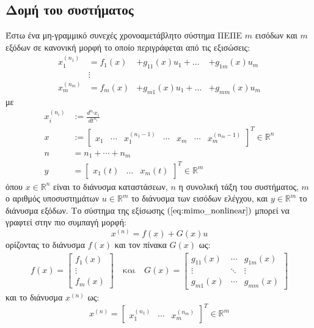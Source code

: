 \subsection{Δομή του συστήματος}
Έστω ένα μη-γραμμικό συνεχές χρονοαμετάβλητο σύστημα ΠΕΠΕ $m$ εισόδων και $m$ εξόδων σε κανονική μορφή το οποίο περιγράφεται από τις εξισώσεις:
\begin{equation}
\begin{alignedat}{3}
x_1^{(n_1)} &= f_1(x)   &+g_{11}(x) u_1 + \dots & + g_{1m}(x)u_m \\
            &\vdots & & \\
x_m^{(n_m)} &= f_m(x)  &+g_{m1}(x) u_1 + \dots & + g_{mm}(x)u_m
\end{alignedat}
\label{eq:mimo_nonlinear}
\end{equation}
με 
\begin{equation*}
\begin{split}
x_i^{(n_i)}    &:= \frac{d^{n_i} x_i }{d t^{n_i}} \\
x   &:= \begin{bmatrix} x_1 &\cdots & x_1^{(n_1-1)} & \cdots &
                               x_m &\cdots & x_m^{(n_m-1)}\end{bmatrix}^T \in \mathbb{R}^n \\
        n  &= n_1 + \cdots  + n_m \\
        y  &= \begin{bmatrix}
        x_1(t) & \dots & x_m(t)
        \end{bmatrix}^T \in \mathbb{R}^m
\end{split}
\end{equation*}
όπου $x \in \mathbb{R}^n$ είναι το διάνυσμα καταστάσεων, $n$ η συνολική τάξη του συστήματος, $m$ ο αριθμός υποσυστημάτων $u \in \mathbb{R}^m$ το διάνυσμα των εισόδων ελέγχου, και $y \in \mathbb{R}^m $ το διάνυσμα εξόδων. Το σύστημα της εξίσωσης $(\ref{eq:mimo_nonlinear})$ μπορεί να γραφτεί στην πιο συμπαγή μορφή:
\begin{equation}
	x^{(n)} = f(x) + G(x)u
	\label{eq:mimo_compact}
\end{equation}
ορίζοντας το διάνυσμα $f(x)$ και τον πίνακα $G(x)$ ως:
\begin{equation}
	\begin{matrix}
	f(x) = \begin{bmatrix} f_1(x) \\ \vdots \\ f_m(x) \end{bmatrix}
	& \: \text{και} \: &
	G(x) = \begin{bmatrix} g_{11}(x) & \cdots & g_{1m}(x) \\
						   \vdots    & \ddots & \vdots    \\
						   g_{m1}(x) & \cdots & g_{mm}(x)
	\end{bmatrix}
	\end{matrix}
	\label{eq:mimo_vec_functions}
\end{equation}
και το διάνυσμα $x^{(n)}$ ως:
\begin{equation*}
	x^{(n)} = \begin{bmatrix} x_1^{(n_1)} & \cdots & x_m^{(n_m)} \end{bmatrix}^T
	\in \mathbb{R}^m
\end{equation*}

